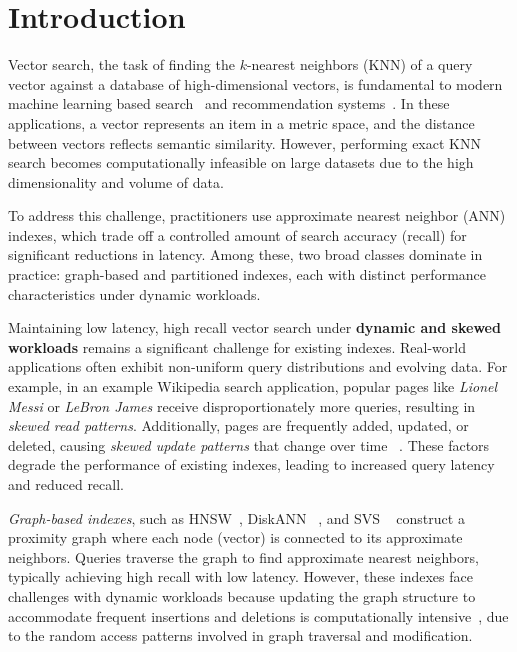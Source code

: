\section{Introduction}
Vector search, the task of finding the $k$-nearest neighbors (KNN) of a query vector against a database of high-dimensional vectors, is fundamental to modern machine learning based search~\cite{grbovic2018real, haldar2019applying, hashemi2021neural, qin2021mixer} and recommendation systems~\cite{okura2017embedding, liu2017related, wang2018billion, pal2020pinnersage, liu2022monolith}. In these applications, a vector represents an item in a metric space, and the distance between vectors reflects semantic similarity. However, performing exact KNN search becomes computationally infeasible on large datasets due to the high dimensionality and volume of data.

To address this challenge, practitioners use approximate nearest neighbor (ANN) indexes, which trade off a controlled amount of search accuracy (recall) for significant reductions in latency. Among these, two broad classes dominate in practice: graph-based and partitioned indexes, each with distinct performance characteristics under dynamic workloads.



Maintaining low latency, high recall vector search under \textbf{dynamic and skewed workloads} remains a significant challenge for existing indexes. Real-world applications often exhibit non-uniform query distributions and evolving data. For example, in an example Wikipedia search application, popular pages like \textit{Lionel Messi} or \textit{LeBron James} receive disproportionately more queries, resulting in \emph{skewed read patterns}. Additionally, pages are frequently added, updated, or deleted, causing \emph{skewed update patterns} that change over time ~\cite{baranchuk_dedrift_2023}. These factors degrade the performance of existing indexes, leading to increased query latency and reduced recall.

\emph{Graph-based indexes}, such as HNSW~\cite{10.1109/TPAMI.2018.2889473}, DiskANN ~\cite{10.5555/3454287.3455520, singh2021freshdiskann}, and SVS ~\cite{aguerrebere2024locally} construct a proximity graph where each node (vector) is connected to its approximate neighbors. Queries traverse the graph to find approximate nearest neighbors, typically achieving high recall with low latency. However, these indexes face challenges with dynamic workloads because updating the graph structure to accommodate frequent insertions and deletions is computationally intensive~\cite{xu_spfresh_2023}, due to the random access patterns involved in graph traversal and modification.

